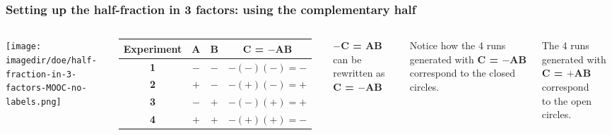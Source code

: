 \begin{frame}\frametitle{Setting up the half-fraction in 3 factors: using the complementary half}
	\begin{columns}
			\begin{center}
				\texttt{[image: \\imagedir/doe/half-fraction-in-3-factors-MOOC-no-labels.png]}
			\end{center}
			
			\begin{tabulary}{\linewidth}{|c||c|c|c|}\hline 
				\textsf{\relax Experiment } & \textbf{\relax A } & \textbf{\relax B } & \textbf{\relax C = $-$AB } \\
				\hline \textbf{1} & \(-\) & \(-\) & \(-(-)(-) = -\) \\
				\hline \textbf{2} & \(+\) & \(-\) & \(-(+)(-) = +\) \\
				\hline \textbf{3} & \(-\) & \(+\) & \(-(-)(+) = +\) \\
				\hline \textbf{4} & \(+\) & \(+\) & \(-(+)(+) = -\) \\
				\hline
			\end{tabulary}
			
			\small
			\vspace{1cm}
			\textbf{\relax $-$C = AB} can be rewritten as \textbf{\relax C = $-$AB}
			
			\vspace{1cm}
			Notice how the 4 runs generated with \textbf{\relax C = $-$AB} correspond to the closed circles.

			\pause
			\vspace{1cm}
			The 4 runs generated with \textbf{\relax C = $+$AB} correspond\\
			to the open circles.
			
	\end{columns}
\end{frame}

